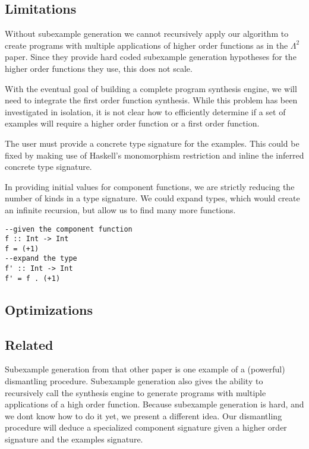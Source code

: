 \subsection{Limitations}

Without subexample generation we cannot recursively apply our algorithm to create programs with multiple applications of higher order functions as in the   $\Lambda^2$ paper\cite{isil}. Since they provide hard coded subexample generation hypotheses for the higher order functions they use, this does not scale.

With the eventual goal of building a complete program synthesis engine, we will need to integrate the first order function synthesis. While this problem has been investigated in isolation, it is not clear how to efficiently determine if  a set of examples will require a higher order function or a first order function.

The user must provide a concrete type signature for the examples. This could be fixed by making use of Haskell's monomorphism restriction and inline the inferred concrete type signature.

In providing initial values for component functions, we are strictly reducing the number of kinds in a type signature.
We could expand types, which would create an infinite recursion, but allow us to find many more functions.

\begin{lstlisting}
--given the component function
f :: Int -> Int
f = (+1)
--expand the type
f' :: Int -> Int
f' = f . (+1)

\end{lstlisting}


\subsection{Optimizations}

\subsection{Related}
Subexample generation from that other paper\cite{isil} is one example of a (powerful) dismantling procedure.
Subexample generation also gives the ability to recursively call the synthesis engine to generate programs with multiple applications of a high order function.
Because subexample generation is hard, and we dont know how to do it yet, we present a different idea.
Our dismantling procedure will deduce a specialized component signature given a higher order signature and the examples signature.